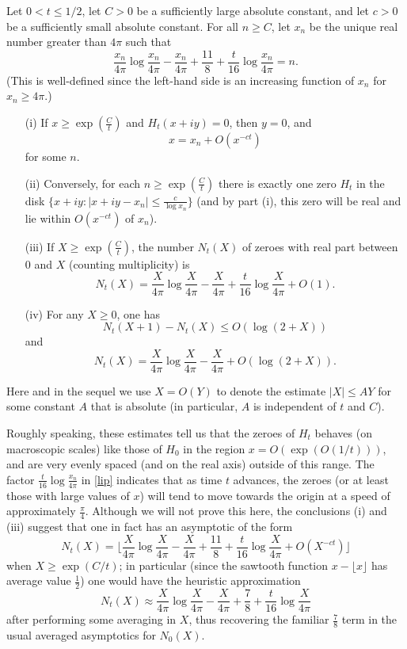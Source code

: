 \begin{theorem}\label{Zero}  Let $0 < t \leq 1/2$, let $C>0$ be a sufficiently large absolute constant, and let $c>0$ be a sufficiently small absolute constant.  For all $n \geq C$, let $x_n$ be the unique real number greater than $4\pi$ such that
\begin{equation}\label{lip}
 \frac{x_n}{4\pi} \log \frac{x_n}{4\pi} - \frac{x_n}{4\pi} + \frac{11}{8} + \frac{t}{16} \log \frac{x_n}{4\pi} = n.
\end{equation}
(This is well-defined since the left-hand side is an increasing function of $x_n$ for $x_n \geq 4\pi$.)
\begin{itemize}
\item[(i)]  If $x \geq \exp(\frac{C}{t})$ and $H_t(x+iy)=0$, then $y=0$, and
$$ x = x_n + O(x^{-ct})$$
for some $n$.  
\item[(ii)]  Conversely, for each $n \geq \exp( \frac{C}{t} )$ there is exactly one zero $H_t$ in the disk $\{ x+iy: |x+iy - x_n| \leq \frac{c}{\log x_n} \}$ (and by part (i), this zero will be real and lie within $O(x^{-ct})$ of $x_n$).
\item[(iii)]  If $X \geq \exp(\frac{C}{t})$, the number $N_t(X)$ of zeroes with real part between $0$ and $X$ (counting multiplicity) is
$$ N_t(X) = \frac{X}{4\pi} \log \frac{X}{4\pi} - \frac{X}{4\pi} + \frac{t}{16} \log \frac{X}{4\pi} + O(1).$$
\item[(iv)]  For any $X \geq 0$, one has
$$ N_t(X+1) - N_t(X) \leq O( \log(2+X) )$$
and
$$ N_t(X) = \frac{X}{4\pi} \log \frac{X}{4\pi} - \frac{X}{4\pi} + O( \log(2+X) ).$$
\end{itemize}
Here and in the sequel we use $X = O(Y)$ to denote the estimate $|X| \leq AY$ for some constant $A$ that is absolute (in particular, $A$ is independent of $t$ and $C$).
\end{theorem}

Roughly speaking, these estimates tell us that the zeroes of $H_t$ behaves (on macroscopic scales) like those of $H_0$ in the region $x = O(\exp(O(1/t)))$, and are very evenly spaced (and on the real axis) outside of this range.  The factor $\frac{t}{16} \log \frac{x_n}{4\pi}$ in \eqref{lip} indicates that as time $t$ advances, the zeroes (or at least those with large values of $x$) will tend to move towards the origin at a speed of approximately $\frac{\pi}{4}$.  Although we will not prove this here, the conclusions (i) and (iii) suggest that one in fact has an asymptotic of the form
$$ N_t(X) = \lfloor  \frac{X}{4\pi} \log \frac{X}{4\pi} - \frac{X}{4\pi} + \frac{11}{8} + \frac{t}{16} \log \frac{X}{4\pi} + O( X^{-ct} ) \rfloor$$
when $X \geq \exp(C/t)$; in particular (since the sawtooth function $x - \lfloor x \rfloor$ has average value $\frac{1}{2}$) one would have the heuristic approximation
$$ N_t(X) \approx \frac{X}{4\pi} \log \frac{X}{4\pi} - \frac{X}{4\pi} + \frac{7}{8} + \frac{t}{16} \log \frac{X}{4\pi} $$
 after performing some averaging in $X$, thus recovering the familiar $\frac{7}{8}$ term in the usual averaged asymptotics for $N_0(X)$.

